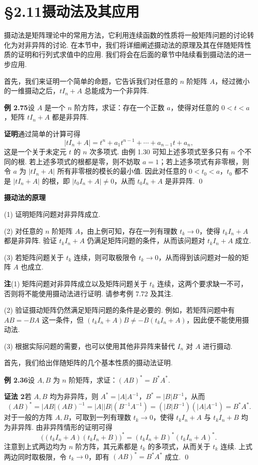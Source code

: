 \documentclass[UTF8,12pt,a4paper,fontset=fandol]{ctexart}
\begin{document}
\section*{§2.11\quad 摄动法及其应用}

摄动法是矩阵理论中的常用方法，它利用连续函数的性质将一般矩阵问题的讨论转化为对非异阵的讨论. 在本节中，我们将详细阐述摄动法的原理及其在伴随矩阵性质的证明和行列式求值中的应用. 我们将会在后面的章节中陆续看到摄动法的进一步应用.

首先，我们来证明一个简单的命题，它告诉我们对任意的 $n$ 阶矩阵 $A$，经过微小的一维摄动之后，$tI_n+A$ 总能成为一个非异阵.

\noindent\textbf{例 2.75}\quad 设 $A$ 是一个 $n$ 阶方阵，求证：存在一个正数 $a$，使得对任意的 $0<t<a$，矩阵 $tI_n+A$ 都是非异阵.

\noindent\textbf{证明}\quad 通过简单的计算可得
\[
|tI_n+A|=t^n+a_1t^{n-1}+\cdots+a_{n-1}t+a_n,
\]
这是一个关于未定元 $t$ 的 $n$ 次多项式. 由例 1.30 可知上述多项式至多只有 $n$ 个不同的根. 若上述多项式的根都是零，则不妨取 $a=1$；若上述多项式有非零根，则令 $a$ 为 $|tI_n+A|$ 所有非零根的模长的最小值. 因此对任意的 $0<t_0<a$，$t_0$ 都不是 $|tI_n+A|$ 的根，即 $|t_0I_n+A|\ne0$，从而 $t_0I_n+A$ 是非异阵. \qed

\noindent\textbf{摄动法的原理}

(1) 证明矩阵问题对非异阵成立.

(2) 对任意的 $n$ 阶矩阵 $A$，由上例可知，存在一列有理数 $t_k\to0$，使得 $t_kI_n+A$ 都是非异阵. 验证 $t_kI_n+A$ 仍满足矩阵问题的条件，从而该问题对 $t_kI_n+A$ 成立.

(3) 若矩阵问题关于 $t_k$ 连续，则可取极限令 $t_k\to0$，从而得到该问题对一般的矩阵 $A$ 也成立.

\noindent\textbf{注}\quad (1) 矩阵问题对非异阵成立以及矩阵问题关于 $t_k$ 连续，这两个要求缺一不可，否则将不能使用摄动法进行证明. 请参考例 7.72 及其注.

(2) 验证摄动矩阵仍然满足矩阵问题的条件是必要的. 例如，若矩阵问题中有 $AB=-BA$ 这一条件，但 $(t_kI_n+A)B\ne-B(t_kI_n+A)$，因此便不能使用摄动法.

(3) 根据实际问题的需要，也可以使用其他非异阵来替代 $I_n$ 对 $A$ 进行摄动.

首先，我们给出伴随矩阵的几个基本性质的摄动法证明.

\noindent\textbf{例 2.36}\quad 设 $A,B$ 为 $n$ 阶矩阵，求证：$(AB)^*=B^*A^*$.

\noindent\textbf{证法 2}\quad 若 $A,B$ 均为非异阵，则 $A^*=|A|A^{-1}$，$B^*=|B|B^{-1}$，从而
\[
(AB)^*=|AB|(AB)^{-1}=|A||B|(B^{-1}A^{-1})=(|B|B^{-1})(|A|A^{-1})=B^*A^*.
\]
对于一般的方阵 $A,B$，可取到一列有理数 $t_k\to0$，使得 $t_kI_n+A$ 与 $t_kI_n+B$ 均为非异阵. 由非异阵情形的证明可得
\[
\bigl((t_kI_n+A)(t_kI_n+B)\bigr)^*=(t_kI_n+B)^*(t_kI_n+A)^*.
\]
注意到上式两边均为 $n$ 阶方阵，其元素都是 $t_k$ 的多项式，从而关于 $t_k$ 连续. 上式两边同时取极限，令 $t_k\to0$，即有 $(AB)^*=B^*A^*$ 成立. \qed
\end{document}
